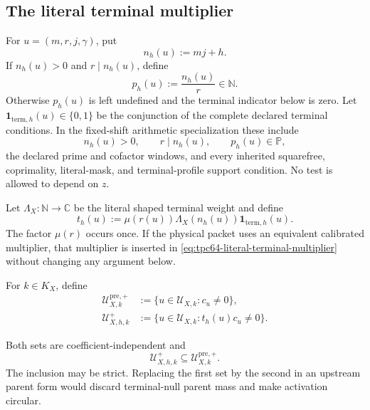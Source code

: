 \subsection{The literal terminal multiplier}

For \(u=(m,r,j,\gamma)\), put
\begin{equation}
 n_h(u):=mj+h.
 \label{eq:tpc64-target-integer}
\end{equation}
If \(n_h(u)>0\) and \(r\mid n_h(u)\), define
\begin{equation}
 p_h(u):=\frac{n_h(u)}r\in\mathbb N.
 \label{eq:tpc64-prime-candidate}
\end{equation}
Otherwise \(p_h(u)\) is left undefined and the terminal indicator below
is zero.  Let
\(\mathbf 1_{\mathrm{term},h}(u)\in\{0,1\}\) be the conjunction of the
complete declared terminal conditions.  In the fixed-shift arithmetic
specialization these include
\begin{equation}
 n_h(u)>0,\qquad r\mid n_h(u),\qquad
 p_h(u)\in\mathbb P,
 \label{eq:tpc64-basic-terminal-tests}
\end{equation}
the declared prime and cofactor windows, and every inherited squarefree,
coprimality, literal-mask, and terminal-profile support condition.  No
test is allowed to depend on \(z\).

Let \(\Lambda_X:\mathbb N\to\mathbb C\) be the literal shaped terminal
weight and define
\begin{equation}
 t_h(u):=
 \mu(r(u))\Lambda_X(n_h(u))
 \mathbf 1_{\mathrm{term},h}(u).
 \label{eq:tpc64-literal-terminal-multiplier}
\end{equation}
The factor \(\mu(r)\) occurs once.  If the physical packet uses an
equivalent calibrated multiplier, that multiplier is inserted in
\eqref{eq:tpc64-literal-terminal-multiplier} without changing any argument
below.

\begin{definition}
\label{def:tpc64-literal-active-incidences}
For \(k\in K_X\), define
\begin{align}
 \mathcal U_{X,k}^{\mathrm{pre},+}
 &:=
 \{u\in\mathcal U_{X,k}:c_u\ne0\},
 \label{eq:tpc64-pre-active-incidence}\\
 \mathcal U_{X,h,k}^{+}
 &:=
 \{u\in\mathcal U_{X,k}:t_h(u)c_u\ne0\}.
 \label{eq:tpc64-terminal-active-incidence}
\end{align}
\end{definition}

Both sets are coefficient-independent and
\begin{equation}
 \mathcal U_{X,h,k}^{+}
 \subseteq\mathcal U_{X,k}^{\mathrm{pre},+}.
 \label{eq:tpc64-active-incidence-inclusion}
\end{equation}
The inclusion may be strict.  Replacing the first set by the second in an
upstream parent form would discard terminal-null parent mass and make
activation circular.

